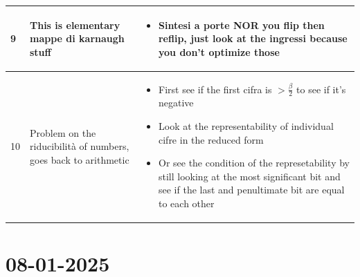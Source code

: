 \documentclass[a4paper,12pt]{article}
\begin{document}
\begin{tabular}{|C{0.7cm}|C{8cm}|C{8cm}|}
        9
        &
        This is elementary mappe di karnaugh stuff
        &
        \begin{itemize}[label=\(\rightarrow\)]
            \item Sintesi a porte NOR you flip then reflip, just look at the ingressi because you don't optimize those
        \end{itemize}
        \\
        \hline


        10
        &
        Problem on the riducibilità of numbers, goes back to arithmetic 
        &
        \begin{itemize}[label=\(\rightarrow\)]
            \item First see if the first cifra is $> \frac{\beta}{2}$ to see if it's negative
            \item Look at the representability of individual cifre in the reduced form
            \item Or see the condition of the represetability by still looking at the most significant bit and see if the last and penultimate bit are equal to each other
        \end{itemize}
        \\
        \hline

    \end{tabular}



\section{08-01-2025}
\end{document}
